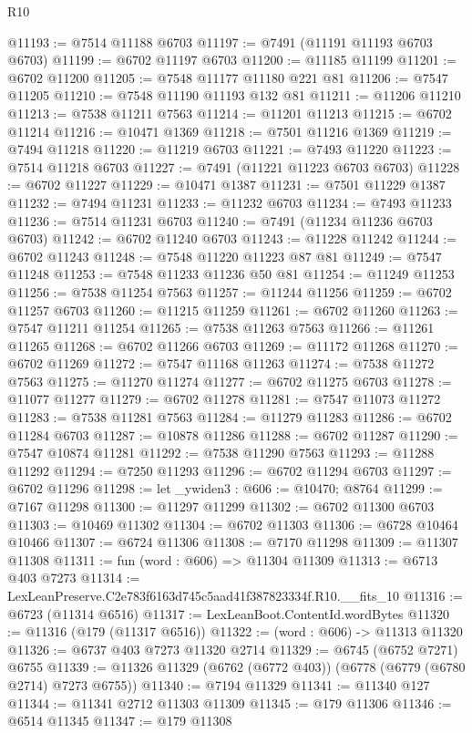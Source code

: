 \begin{lexlean}{R10}
\begin{coremodule}
@11193 := @7514 @11188 @6703
@11197 := @7491 (@11191 @11193 @6703 @6703)
@11199 := @6702 @11197 @6703
@11200 := @11185 @11199
@11201 := @6702 @11200
@11205 := @7548 @11177 @11180 @221 @81
@11206 := @7547 @11205
@11210 := @7548 @11190 @11193 @132 @81
@11211 := @11206 @11210
@11213 := @7538 @11211 @7563
@11214 := @11201 @11213
@11215 := @6702 @11214
@11216 := @10471 @1369
@11218 := @7501 @11216 @1369
@11219 := @7494 @11218
@11220 := @11219 @6703
@11221 := @7493 @11220
@11223 := @7514 @11218 @6703
@11227 := @7491 (@11221 @11223 @6703 @6703)
@11228 := @6702 @11227
@11229 := @10471 @1387
@11231 := @7501 @11229 @1387
@11232 := @7494 @11231
@11233 := @11232 @6703
@11234 := @7493 @11233
@11236 := @7514 @11231 @6703
@11240 := @7491 (@11234 @11236 @6703 @6703)
@11242 := @6702 @11240 @6703
@11243 := @11228 @11242
@11244 := @6702 @11243
@11248 := @7548 @11220 @11223 @87 @81
@11249 := @7547 @11248
@11253 := @7548 @11233 @11236 @50 @81
@11254 := @11249 @11253
@11256 := @7538 @11254 @7563
@11257 := @11244 @11256
@11259 := @6702 @11257 @6703
@11260 := @11215 @11259
@11261 := @6702 @11260
@11263 := @7547 @11211 @11254
@11265 := @7538 @11263 @7563
@11266 := @11261 @11265
@11268 := @6702 @11266 @6703
@11269 := @11172 @11268
@11270 := @6702 @11269
@11272 := @7547 @11168 @11263
@11274 := @7538 @11272 @7563
@11275 := @11270 @11274
@11277 := @6702 @11275 @6703
@11278 := @11077 @11277
@11279 := @6702 @11278
@11281 := @7547 @11073 @11272
@11283 := @7538 @11281 @7563
@11284 := @11279 @11283
@11286 := @6702 @11284 @6703
@11287 := @10878 @11286
@11288 := @6702 @11287
@11290 := @7547 @10874 @11281
@11292 := @7538 @11290 @7563
@11293 := @11288 @11292
@11294 := @7250 @11293
@11296 := @6702 @11294 @6703
@11297 := @6702 @11296
@11298 := let _ywiden3 : @606 := @10470; @8764
@11299 := @7167 @11298
@11300 := @11297 @11299
@11302 := @6702 @11300 @6703
@11303 := @10469 @11302
@11304 := @6702 @11303
@11306 := @6728 @10464 @10466
@11307 := @6724 @11306
@11308 := @7170 @11298
@11309 := @11307 @11308
@11311 := fun (word : @606) => @11304 @11309
@11313 := @6713 @403 @7273
@11314 := LexLeanPreserve.C2e783f6163d745c5aad41f387823334f.R10.__fits_10
@11316 := @6723 (@11314 @6516)
@11317 := LexLeanBoot.ContentId.wordBytes
@11320 := @11316 (@179 (@11317 @6516))
@11322 := (word : @606) -> @11313 @11320
@11326 := @6737 @403 @7273 @11320 @2714
@11329 := @6745 (@6752 @7271) @6755
@11339 := @11326 @11329 (@6762 (@6772 @403)) (@6778 (@6779 (@6780 @2714) @7273 @6755))
@11340 := @7194 @11329
@11341 := @11340 @127
@11344 := @11341 @2712 @11303 @11309
@11345 := @179 @11306
@11346 := @6514 @11345
@11347 := @179 @11308

\end{coremodule}
\end{lexlean}
